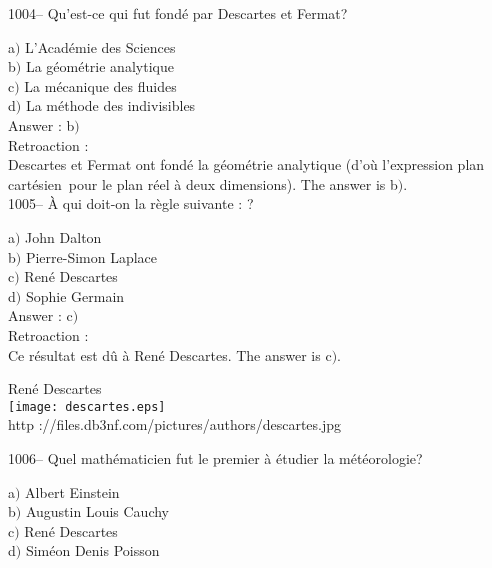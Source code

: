 ﻿\documentclass[letterpaper, 12pt]{article}
\begin{document}
1004-- Qu'est-ce qui fut fond\'e par Descartes et Fermat?

a$)$ L'Acad\'emie des Sciences \\
b$)$ La g\'eom\'etrie analytique \\
c$)$ La m\'ecanique des fluides \\
d$)$ La m\'ethode des indivisibles\\

Answer : b$)$\\

Retroaction : \\
Descartes et Fermat ont fond\'e la g\'eom\'etrie analytique (d'o\`u
l'expression \og plan cart\'esien\fg\ pour le plan r\'eel \`a deux
dimensions).
The answer is b$)$.\\

1005-- \`A qui doit-on la r\`egle suivante : \fg ?

a$)$ John Dalton \\
b$)$ Pierre-Simon Laplace \\
c$)$ Ren\'e Descartes \\
d$)$ Sophie Germain\\

Answer : c$)$\\

Retroaction : \\
Ce r\'esultat est d\^u \`a Ren\'e Descartes.
The answer is c$)$.\\

        \begin{center}
        Ren\'e Descartes\\
    \texttt{[image: descartes.eps]}\\
        {\footnotesize http
://files.db3nf.com/pictures/authors/descartes.jpg}
    \end{center}

1006-- Quel math\'ematicien fut le premier \`a \'etudier la
m\'et\'eorologie?

a$)$ Albert Einstein \\
b$)$ Augustin Louis Cauchy \\
c$)$ Ren\'e Descartes \\
d$)$ Sim\'eon Denis Poisson\\
\end{document}
